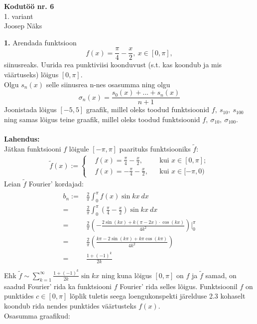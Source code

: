 \documentclass{article}
\begin{document}
\begin{center}
\Large\textbf{Kodutöö nr. 6}\\
1. variant\\
\small{Joosep Näks}
\end{center}
\textbf{1. }Arendada funktsioon$$f(x)=\frac{\pi}4-\frac x2,\ x\in[0,\pi],$$siinusreaks. Uurida rea punktiviisi koonduvust (s.t. kas koondub ja mis väärtuseks) lõigus $[0,\pi]$.\\
Olgu $s_n(x)$ selle siinusrea n-nes osasumma ning olgu $$\sigma_n(x)=\frac{s_0(x)+...+s_n(x)}{n+1}$$ Joonistada lõigus $[-5,5]$ graafik, millel oleks toodud funktsioonid $f,\ s_{10},\ s_{100}$ ning samas lõigus teine graafik, millel oleks toodud funktsioonid $f,\ \sigma_{10},\ \sigma_{100}$.\\\\
\textbf{Lahendus:}\\
Jätkan funktsiooni $f$ lõigule $[-\pi,\pi]$ paarituks funktsiooniks $\tilde{f}$:
\begin{gather*}
\tilde f(x):=\left\{\begin{aligned}
&f(x)=\frac{\pi}4-\frac x2,&&\text{kui }x\in[0,\pi];\\
&f(x)=-\frac{\pi}4-\frac x2,&&\text{kui }x\in[-\pi,0)
\end{aligned}
\right.
\end{gather*}
Leian $\tilde f$ Fourier' kordajad:
\begin{gather*}
\begin{aligned}
b_n:=&\frac2{\pi}\int_0^{\pi}f(x)\sin kx\ dx\\
=&\frac2{\pi}\int_0^{\pi}\left(\frac{\pi}4-\frac x2 \right)\sin kx\ dx\\
=&\frac2{\pi}\left(-\frac{2\sin(kx)+k(\pi-2x)\cdot\cos(kx)}{4k^2}\right)\Bigg|_0^{\pi}\\
=&\frac2{\pi}\left(\frac{k\pi-2\sin(k\pi)+k\pi\cos(k\pi)}{4k^2}\right)\\
=&\frac{1+(-1)^{k}}{2k}\\
\end{aligned}
\end{gather*}
Ehk $\tilde f \sim \sum_{k=1}^\infty\frac{1+(-1)^k}{2k}\sin kx$ ning kuna lõigus $[0,\pi]$ on $f$ ja $\tilde f$ samad, on saadud Fourier' rida ka funktsiooni $f$ Fourier' rida selles lõigus. Funktsioonil $f$ on punktides $c\in[0,\pi]$ lõplik tuletis seega loengukonspekti järelduse 2.3 kohaselt koondub rida nendes punktides väärtusteks $f(x)$.\\
Osasumma graafikud:
\end{document}
